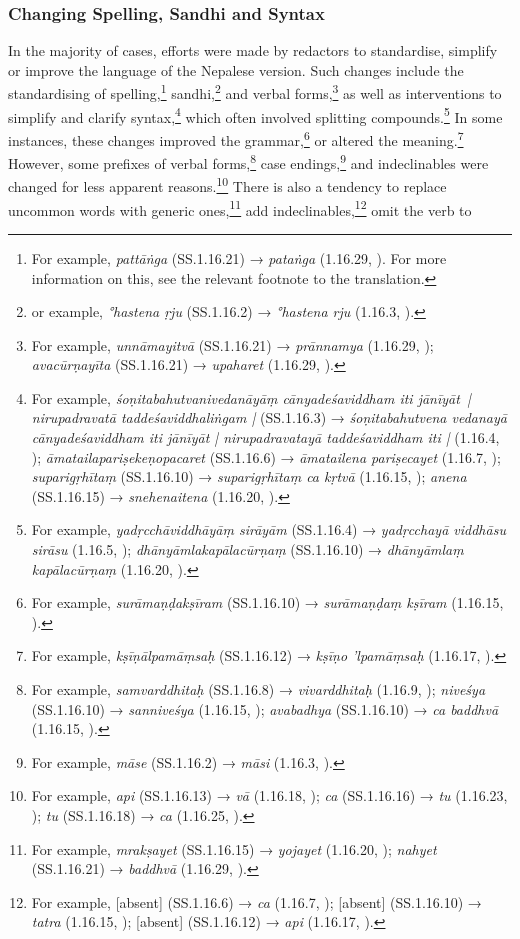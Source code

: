 \subsubsection{Changing Spelling, Sandhi and Syntax}
In the majority of cases, efforts were made by redactors to standardise, simplify or improve the language of the Nepalese version. Such changes include the standardising of spelling,\footnote{For example, \emph{pattāṅga} (SS.1.16.21) → \emph{pataṅga} (1.16.29, \cite[81]{vulgate}). For more information on this, see the relevant footnote to the translation.} sandhi,\footnote{or example, \emph{°hastena ṛju} (SS.1.16.2) → \emph{°hastena rju} (1.16.3, \cite[76]{vulgate}).} and verbal forms,\footnote{For example, \emph{unnāmayitvā} (SS.1.16.21) → \emph{prānnamya} (1.16.29, \cite[81]{vulgate}); \emph{avacūrṇayīta} (SS.1.16.21) → \emph{upaharet} (1.16.29, \cite[81]{vulgate}).} as well as interventions to simplify and clarify syntax,\footnote{For example, \emph{śoṇitabahutvanivedanāyāṃ cānyadeśaviddham iti jānīyāt | nirupadravatā taddeśaviddhaliṅgam |} (SS.1.16.3) → \emph{śoṇitabahutvena vedanayā cānyadeśaviddham iti jānīyāt | nirupadravatayā taddeśaviddham iti |} (1.16.4, \cite[76]{vulgate}); \emph{āmatailapariṣekeṇopacaret} (SS.1.16.6) → \emph{āmatailena pariṣecayet} (1.16.7, \cite[77]{vulgate}); \emph{suparigṛhītaṃ} (SS.1.16.10) → \emph{suparigṛhītaṃ ca kṛtvā} (1.16.15, \cite[78]{vulgate}); \emph{anena} (SS.1.16.15) → \emph{snehenaitena} (1.16.20, \cite[79]{vulgate}).} which often involved splitting compounds.\footnote{For example, \emph{yadṛcchāviddhāyāṃ sirāyām} (SS.1.16.4) → \emph{yadṛcchayā viddhāsu	sirāsu} (1.16.5, \cite[76]{vulgate}); \emph{dhānyāmlakapālacūrṇaṃ} (SS.1.16.10) → \emph{dhānyāmlaṃ kapālacūrṇaṃ} (1.16.20, \cite[78]{vulgate}).} In some instances, these changes improved the grammar,\footnote{For example, \emph{surāmaṇḍakṣīram} (SS.1.16.10) → \emph{surāmaṇḍaṃ kṣīram} (1.16.15, \cite[78]{vulgate}).} or altered the meaning.\footnote{For example, \emph{kṣīṇālpamāṃsaḥ} (SS.1.16.12) → \emph{kṣīṇo 'lpamāṃsaḥ} (1.16.17, \cite[79]{vulgate}).} However, some prefixes of verbal forms,\footnote{For example, \emph{samvarddhitaḥ} (SS.1.16.8) → \emph{vivarddhitaḥ} (1.16.9, \cite[77]{vulgate}); \emph{niveśya} (SS.1.16.10) → \emph{sanniveśya} (1.16.15, \cite[78]{vulgate}); \emph{avabadhya} (SS.1.16.10) → \emph{ca baddhvā} (1.16.15, \cite[78]{vulgate}).} case endings,\footnote{For example, \emph{māse} (SS.1.16.2) → \emph{māsi} (1.16.3, \cite[76]{vulgate}).} and indeclinables were changed for less apparent reasons.\footnote{For example, \emph{api} (SS.1.16.13) → \emph{vā} (1.16.18, \cite[79]{vulgate}); \emph{ca} (SS.1.16.16) → \emph{tu} (1.16.23, \cite[79]{vulgate}); \emph{tu} (SS.1.16.18) → \emph{ca} (1.16.25, \cite[80]{vulgate}).} There is also a tendency to replace uncommon words with generic ones,\footnote{For example, \emph{mrakṣayet} (SS.1.16.15) → \emph{yojayet} (1.16.20, \cite[79]{vulgate}); \emph{nahyet} (SS.1.16.21) → \emph{baddhvā} (1.16.29, \cite[81]{vulgate}).} add indeclinables,\footnote{For example, [absent]  (SS.1.16.6) → \emph{ca} (1.16.7, \cite[77]{vulgate}); [absent] (SS.1.16.10) → \emph{tatra} (1.16.15, \cite[78]{vulgate}); [absent]  (SS.1.16.12) → \emph{api} (1.16.17, \cite[79]{vulgate}).} omit the verb to 